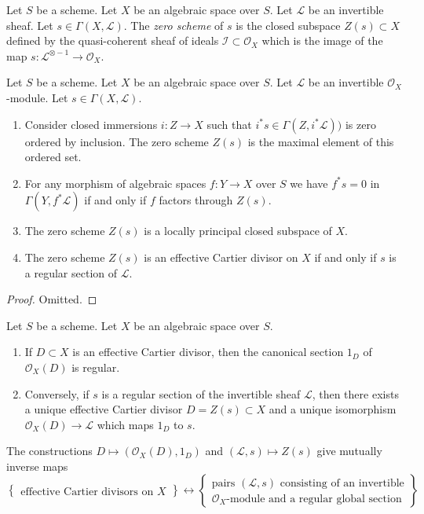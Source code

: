 \begin{definition}
\label{definition-zero-scheme-s}
Let $S$ be a scheme. Let $X$ be an algebraic space over $S$.
Let $\mathcal{L}$ be an invertible sheaf.
Let $s \in \Gamma(X, \mathcal{L})$.
The {\it zero scheme} of $s$ is the closed subspace $Z(s) \subset X$
defined by the quasi-coherent sheaf of ideals
$\mathcal{I} \subset \mathcal{O}_X$ which is the image of the
map $s : \mathcal{L}^{\otimes -1} \to \mathcal{O}_X$.
\end{definition}

\begin{lemma}
\label{lemma-zero-scheme}
Let $S$ be a scheme. Let $X$ be an algebraic space over $S$.
Let $\mathcal{L}$ be an invertible $\mathcal{O}_X$-module.
Let $s \in \Gamma(X, \mathcal{L})$.
\begin{enumerate}
\item Consider closed immersions $i : Z \to X$ such that
$i^*s \in \Gamma(Z, i^*\mathcal{L}))$ is zero
ordered by inclusion. The zero scheme $Z(s)$ is the
maximal element of this ordered set.
\item For any morphism of algebraic spaces $f : Y \to X$ over $S$
we have $f^*s = 0$ in $\Gamma(Y, f^*\mathcal{L})$ if and only if
$f$ factors through $Z(s)$.
\item The zero scheme $Z(s)$ is a locally principal closed subspace of $X$.
\item The zero scheme $Z(s)$ is an effective Cartier divisor on $X$
if and only if $s$ is a regular section of $\mathcal{L}$.
\end{enumerate}
\end{lemma}

\begin{proof}
Omitted.
\end{proof}

\begin{lemma}
\label{lemma-characterize-OD}
Let $S$ be a scheme. Let $X$ be an algebraic space over $S$.
\begin{enumerate}
\item If $D \subset X$ is an effective Cartier divisor, then
the canonical section $1_D$ of $\mathcal{O}_X(D)$ is regular.
\item Conversely, if $s$ is a regular section of the invertible
sheaf $\mathcal{L}$, then there exists a unique effective
Cartier divisor $D = Z(s) \subset X$ and a unique isomorphism
$\mathcal{O}_X(D) \to \mathcal{L}$ which maps $1_D$ to $s$.
\end{enumerate}
The constructions
$D \mapsto (\mathcal{O}_X(D), 1_D)$ and $(\mathcal{L}, s) \mapsto Z(s)$
give mutually inverse maps
$$
\left\{
\begin{matrix}
\text{effective Cartier divisors on }X
\end{matrix}
\right\}
\leftrightarrow
\left\{
\begin{matrix}
\text{pairs }(\mathcal{L}, s)\text{ consisting of an invertible}\\
\mathcal{O}_X\text{-module and a regular global section}
\end{matrix}
\right\}
$$
\end{lemma}

